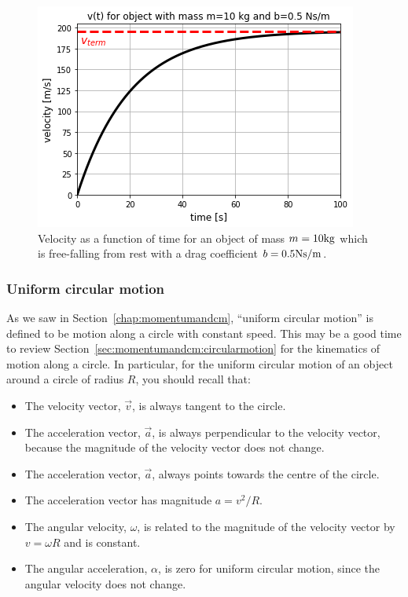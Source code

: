 \begin{framed}
\begin{framed}
\begin{figure}[!htbp]
\centering
\includegraphics[width=0.7\linewidth]{files/drag_vt-801a0464afdbabb69c22a18071c30d9b.png}
\caption[]{Velocity as a function of time for an object of mass $m={\rm 10{kg}}$ which is free-falling from rest with a drag coefficient $b={\rm{0.5}{Ns/m}}$.}
\label{fig:applyingnewtonslaws:drag_vt}
\end{figure}
\end{framed}
\end{framed}

\subsubsection{Uniform circular motion}

As we saw in Section~\ref{chap:momentumandcm}, ``uniform circular motion'' is defined to be motion along a circle with constant speed. This may be a good time to review Section~\ref{sec:momentumandcm:circularmotion} for the kinematics of motion along a circle. In particular, for the uniform circular motion of an object around a circle of radius $R$, you should recall that:

\begin{itemize}
\item The velocity vector, $\vec v$, is always tangent to the circle.
\item The acceleration vector, $\vec a$, is always perpendicular to the velocity vector, because the magnitude of the velocity vector does not change.
\item The acceleration vector, $\vec a$, always points towards the centre of the circle.
\item The acceleration vector has magnitude $a=v^2/R$.
\item The angular velocity, $\omega$, is related to the magnitude of the velocity vector by $v=\omega R$ and is constant.
\item The angular acceleration, $\alpha$, is zero for uniform circular motion, since the angular velocity does not change.
\end{itemize}

